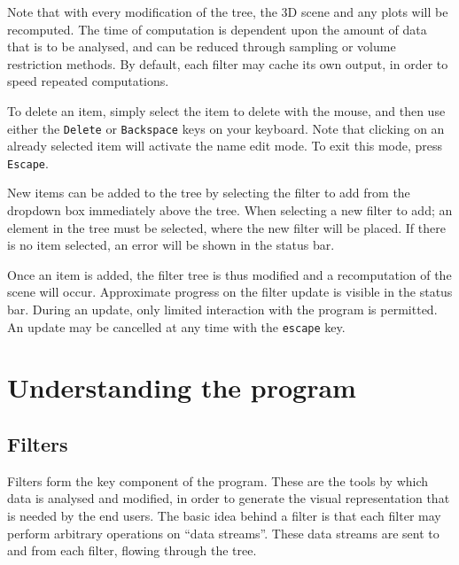 \documentclass[10pt]{article}
\begin{document}
Note that with every modification of the tree, the 3D scene and any plots will be recomputed. The time of computation is dependent upon the amount of data that is to be analysed, and can be reduced through sampling or volume restriction methods. By default, each filter may cache its own output, in order to speed repeated computations.

To delete an item, simply select the item to delete with the mouse, and then use either the \texttt{Delete}  or  \texttt{Backspace} keys on your keyboard. Note that clicking on an already selected item will activate the name edit mode. To exit this mode, press \texttt{Escape}. 

New items can be added to the tree by selecting the filter to add from the dropdown box immediately above the tree. When selecting a new filter to add; an element in the tree must be selected, where the new filter will be placed. If there is no item selected, an error will be shown in the status bar.  

Once an item is added, the filter tree is thus modified and a recomputation of the scene will occur. Approximate progress on the filter update is visible in the status bar. During an update, only limited interaction with the program is permitted. An update may be cancelled at any time with the \texttt{escape} key. 





\section{Understanding the program}
\subsection{Filters}

Filters form the key component of the program. These are the tools by which data is analysed and modified, in order to generate the visual representation that is needed by the end users. The basic idea behind a filter is that each filter may perform arbitrary operations on ``data streams''. These data streams are sent to and from each filter, flowing through the tree.
\end{document}
